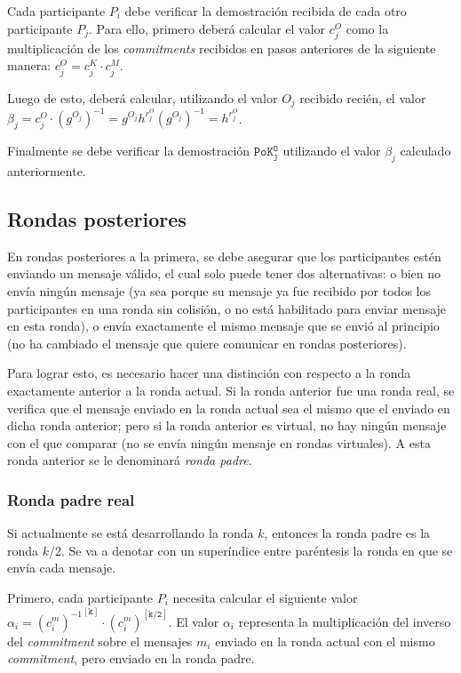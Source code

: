 Cada participante $P_i$ debe verificar la demostración recibida de cada otro 
participante $P_j$. Para ello, primero deberá calcular el valor $c_j^O$ como la 
multiplicación de los \emph{commitments} recibidos en pasos anteriores de la 
siguiente manera: $c_j^O = c_j^K \cdot c_j^M$.

Luego de esto, deberá calcular, utilizando el valor $O_j$ recibido recién, el 
valor $\beta_j = c_j^O \cdot (g^{O_j})^{-1} = g^{O_j} h^{r_j^O} (g^{O_j})^{-1} = h^{r_j^O}$.

Finalmente se debe verificar la demostración $\mathtt{PoK_j^O}$ utilizando el 
valor $\beta_j$ calculado anteriormente.

\subsection{Rondas posteriores}

En rondas posteriores a la primera, se debe asegurar que los participantes estén 
enviando un mensaje válido, el cual solo puede tener dos alternativas: o bien no envía 
ningún mensaje (ya sea porque su mensaje ya fue recibido por todos los participantes 
en una ronda sin colisión, o no está habilitado para enviar mensaje en esta ronda), o 
envía exactamente el mismo mensaje que se envió al principio (no ha cambiado el mensaje 
que quiere comunicar en rondas posteriores).

Para lograr esto, es necesario hacer una distinción con respecto a la ronda exactamente 
anterior a la ronda actual. Si la ronda anterior fue una ronda real, se verifica que 
el mensaje enviado en la ronda actual sea el mismo que el enviado en dicha ronda anterior; 
pero si la ronda anterior es virtual, no hay ningún mensaje con el que comparar 
(no se envía ningún mensaje en rondas virtuales). A esta ronda anterior se le 
denominará \emph{ronda padre}.

\subsubsection{Ronda padre real}

Si actualmente se está desarrollando la ronda $k$, entonces la ronda padre es la 
ronda $k/2$. Se va a denotar con un superíndice entre paréntesis la ronda en que 
se envía cada mensaje.

Primero, cada participante $P_i$ necesita calcular el siguiente valor 
$\alpha_i = {(c_i^m)^{-1}}^\mathtt{[k]} \cdot {(c_i^m)}^\mathtt{[k/2]}$. El valor 
$\alpha_i$ representa la multiplicación del inverso del \emph{commitment} sobre el 
mensajes $m_i$ enviado en la ronda actual con el mismo \emph{commitment}, pero 
enviado en la ronda padre.

